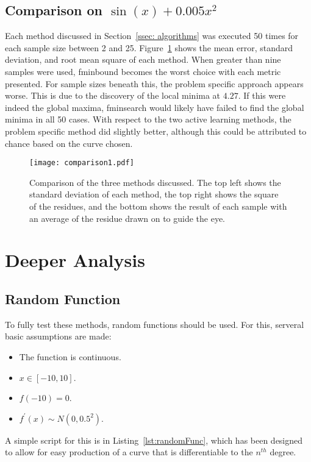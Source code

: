 \subsection[Comparison One]{Comparison on $\sin(x)+0.005x^2$}

Each method discussed in Section~\ref{ssec: algorithms} was executed 50 times for each sample size between 2 and 25. Figure~\ref{fig:firstComparison} shows the mean error, standard deviation, and root mean square of each method. When greater than nine samples were used, fminbound \cite{2020SciPy-NMeth} becomes the worst choice with each metric presented. For sample sizes beneath this, the problem specific approach appears worse. This is due to the discovery of the local minima at $4.27$. If this were indeed the global maxima, fminsearch would likely have failed to find the global minima in all 50 cases. With respect to the two active learning methods, the problem specific method did slightly better, although this could be attributed to chance based on the curve chosen.

\begin{figure}[htbp!] 
  \centering    
  \texttt{[image: comparison1.pdf]}
  \caption[First Comparison]{Comparison of the three methods discussed. The top left shows the standard deviation of each method, the top right shows the square of the residues, and the bottom shows the result of each sample with an average of the residue drawn on to guide the eye.}
  \label{fig:firstComparison}
\end{figure}

\section{Deeper Analysis}
\subsection{Random Function}
To fully test these methods, random functions should be used. For this, serveral basic assumptions are made:
\begin{itemize}
  \item The function is continuous.
  \item $x\in[-10, 10]$.
  \item $f(-10)=0$.
  \item $f^{\prime}(x)\sim N(0, 0.5^2)$.
\end{itemize}
A simple script for this is in Listing~\ref{lst:randomFunc}, which has been designed to allow for easy production of a curve that is differentiable to the $n^{th}$ degree.

